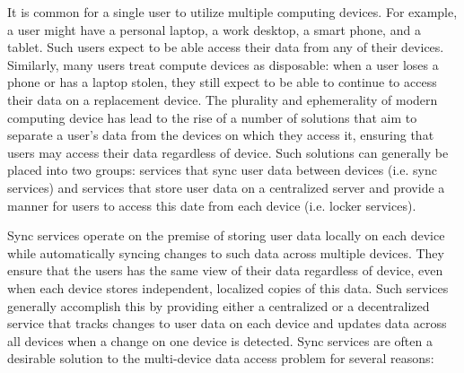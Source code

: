 It is common for a single user to utilize multiple computing
devices. For example, a user might have a personal laptop, a work
desktop, a smart phone, and a tablet. Such users expect to be able
access their data from any of their devices. Similarly, many users
treat compute devices as disposable: when a user loses a phone or has
a laptop stolen, they still expect to be able to continue to access
their data on a replacement device. The plurality and ephemerality of
modern computing device has lead to the rise of a number of solutions
that aim to separate a user's data from the devices on which they
access it, ensuring that users may access their data regardless of
device. Such solutions can generally be placed into two groups:
services that sync user data between devices (i.e. sync services) and
services that store user data on a centralized server and provide a
manner for users to access this date from each device (i.e. locker
services).

Sync services operate on the premise of storing user data locally on
each device while automatically syncing changes to such data across
multiple devices. They ensure that the users has the same view of
their data regardless of device, even when each device stores
independent, localized copies of this data. Such services generally
accomplish this by providing either a centralized or a decentralized
service that tracks changes to user data on each device and updates
data across all devices when a change on one device is detected. Sync
services are often a desirable solution to the multi-device data
access problem for several reasons:

